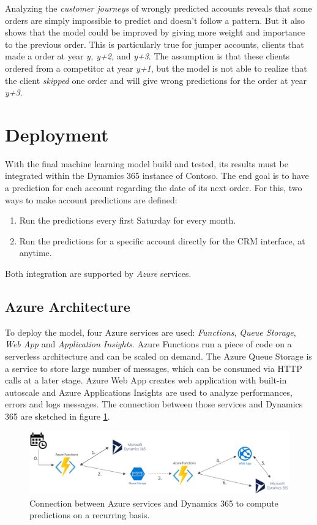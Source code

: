 Analyzing the \textit{customer journeys} of wrongly predicted accounts reveals that some orders are simply impossible to predict and doesn't follow a pattern. But it also shows that the model could be improved by giving more weight and importance to the previous order. This is particularly true for jumper accounts, clients that made a order at year \textit{y, y+2,} and \textit{y+3}. The assumption is that these clients ordered from a competitor at year \textit{y+1}, but the model is not able to realize that the client \textit{skipped} one order and will give wrong predictions for the order at year \textit{y+3}.

\section{Deployment} \label{sec:crm-deployment}
With the final machine learning model build and tested, its results must be integrated within the Dynamics 365 instance of Contoso. The end goal is to have a prediction for each account regarding the date of its next order. For this, two ways to make account predictions are defined:
\begin{enumerate}
    \item Run the predictions every first Saturday for every month.
    \item Run the predictions for a specific account directly for the CRM interface, at anytime.
\end{enumerate}

Both integration are supported by \textit{Azure} services.

\subsection{Azure Architecture}
To deploy the model, four Azure services are used: \textit{Functions}, \textit{Queue Storage}, \textit{Web App} and \textit{Application Insights}. Azure Functions run a piece of code on a serverless architecture and can be scaled on demand. The Azure Queue Storage is a service to store large number of messages, which can be consumed via HTTP calls at a later stage. Azure Web App creates web application with built-in autoscale and Azure Applications Insights are used to analyze performances, errors and logs messages. The connection between those services and Dynamics 365 are sketched in figure \ref{fig:azure-deployment}.

\begin{figure}[htbp]
    \centering
    \includegraphics[width=12cm]{images/azure-archi-weekly.png}
    \caption[Deployment architecture for scheduled predictions]{Connection between Azure services and Dynamics 365 to compute predictions on a recurring basis.}
    \label{fig:azure-deployment}
\end{figure}

